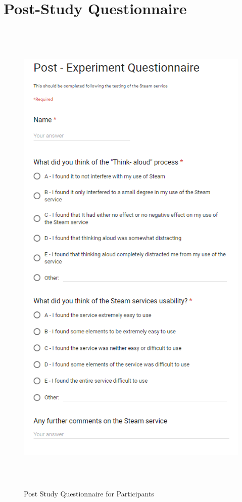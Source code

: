\section{Post-Study Questionnaire}
\begin{figure}[H]
    \includegraphics[width=16cm,height=24cm]{Screenshots/StudyMaterialScreenshots/postStudyQuestionaire.png}
    \caption{Post Study Questionnaire for Participants}
\end{figure}

